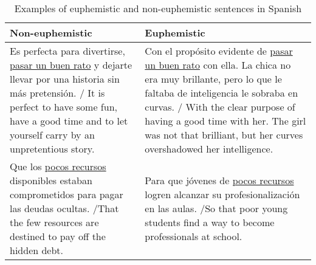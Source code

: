 \documentclass[11pt]{article}
\begin{document}
\begin{table*}[!h]
\begin{small}
\centering
\begin{tabular}{p{7cm}|p{7cm}}
\textbf{Non-euphemistic} & \textbf{Euphemistic}\\
\hline
Es perfecta para divertirse, \underline{pasar un buen rato} y dejarte llevar por una historia sin m\'{a}s pretensi\'{o}n. / It is perfect to have some fun, have a good time and to let yourself carry by an unpretentious story. & Con el prop\'{o}sito evidente de \underline{pasar un buen rato} con ella. La chica no era muy brillante, pero lo que le faltaba de inteligencia le sobraba en curvas. / With the clear purpose of having a good time with her. The girl was not that brilliant, but her curves overshadowed her intelligence. \\
            \hline

Que los \underline{pocos recursos} disponibles estaban comprometidos para pagar las deudas ocultas. /That the few resources are destined to pay off the hidden debt.  &  
Para que j\'{o}venes de \underline{pocos recursos} logren alcanzar su profesionalizaci\'{o}n en las aulas. /So that poor young students find a way to become professionals at school.\\
\hline
\end{tabular}
\caption{Examples of euphemistic and non-euphemistic sentences in Spanish}
\label{tab:spanish}
\end{small}
\end{table*} 

\end{document}
